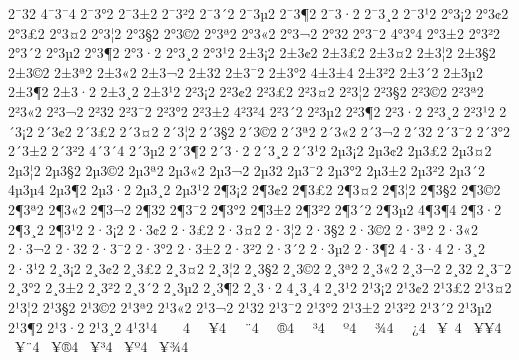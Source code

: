 {2^^af3^^ad2
4^^af3^^af4
2^^af3^^b02
2^^af3^^b12
2^^af3^^b22
2^^af3^^b42
2^^af3^^b52
2^^af3^^b62
2^^af3^^b72
2^^af3^^b82
2^^af3^^b92
2^^b03^^a12
2^^b03^^a22
2^^b03^^a32
2^^b03^^a42
2^^b03^^a62
2^^b03^^a72
2^^b03^^a92
2^^b03^^aa2
2^^b03^^ab2
2^^b03^^ac2
2^^b03^^ad2
2^^b03^^af2
4^^b03^^b04
2^^b03^^b12
2^^b03^^b22
2^^b03^^b42
2^^b03^^b52
2^^b03^^b62
2^^b03^^b72
2^^b03^^b82
2^^b03^^b92
2^^b13^^a12
2^^b13^^a22
2^^b13^^a32
2^^b13^^a42
2^^b13^^a62
2^^b13^^a72
2^^b13^^a92
2^^b13^^aa2
2^^b13^^ab2
2^^b13^^ac2
2^^b13^^ad2
2^^b13^^af2
2^^b13^^b02
4^^b13^^b14
2^^b13^^b22
2^^b13^^b42
2^^b13^^b52
2^^b13^^b62
2^^b13^^b72
2^^b13^^b82
2^^b13^^b92
2^^b23^^a12
2^^b23^^a22
2^^b23^^a32
2^^b23^^a42
2^^b23^^a62
2^^b23^^a72
2^^b23^^a92
2^^b23^^aa2
2^^b23^^ab2
2^^b23^^ac2
2^^b23^^ad2
2^^b23^^af2
2^^b23^^b02
2^^b23^^b12
4^^b23^^b24
2^^b23^^b42
2^^b23^^b52
2^^b23^^b62
2^^b23^^b72
2^^b23^^b82
2^^b23^^b92
2^^b43^^a12
2^^b43^^a22
2^^b43^^a32
2^^b43^^a42
2^^b43^^a62
2^^b43^^a72
2^^b43^^a92
2^^b43^^aa2
2^^b43^^ab2
2^^b43^^ac2
2^^b43^^ad2
2^^b43^^af2
2^^b43^^b02
2^^b43^^b12
2^^b43^^b22
4^^b43^^b44
2^^b43^^b52
2^^b43^^b62
2^^b43^^b72
2^^b43^^b82
2^^b43^^b92
2^^b53^^a12
2^^b53^^a22
2^^b53^^a32
2^^b53^^a42
2^^b53^^a62
2^^b53^^a72
2^^b53^^a92
2^^b53^^aa2
2^^b53^^ab2
2^^b53^^ac2
2^^b53^^ad2
2^^b53^^af2
2^^b53^^b02
2^^b53^^b12
2^^b53^^b22
2^^b53^^b42
4^^b53^^b54
2^^b53^^b62
2^^b53^^b72
2^^b53^^b82
2^^b53^^b92
2^^b63^^a12
2^^b63^^a22
2^^b63^^a32
2^^b63^^a42
2^^b63^^a62
2^^b63^^a72
2^^b63^^a92
2^^b63^^aa2
2^^b63^^ab2
2^^b63^^ac2
2^^b63^^ad2
2^^b63^^af2
2^^b63^^b02
2^^b63^^b12
2^^b63^^b22
2^^b63^^b42
2^^b63^^b52
4^^b63^^b64
2^^b63^^b72
2^^b63^^b82
2^^b63^^b92
2^^b73^^a12
2^^b73^^a22
2^^b73^^a32
2^^b73^^a42
2^^b73^^a62
2^^b73^^a72
2^^b73^^a92
2^^b73^^aa2
2^^b73^^ab2
2^^b73^^ac2
2^^b73^^ad2
2^^b73^^af2
2^^b73^^b02
2^^b73^^b12
2^^b73^^b22
2^^b73^^b42
2^^b73^^b52
2^^b73^^b62
4^^b73^^b74
2^^b73^^b82
2^^b73^^b92
2^^b83^^a12
2^^b83^^a22
2^^b83^^a32
2^^b83^^a42
2^^b83^^a62
2^^b83^^a72
2^^b83^^a92
2^^b83^^aa2
2^^b83^^ab2
2^^b83^^ac2
2^^b83^^ad2
2^^b83^^af2
2^^b83^^b02
2^^b83^^b12
2^^b83^^b22
2^^b83^^b42
2^^b83^^b52
2^^b83^^b62
2^^b83^^b72
4^^b83^^b84
2^^b83^^b92
2^^b93^^a12
2^^b93^^a22
2^^b93^^a32
2^^b93^^a42
2^^b93^^a62
2^^b93^^a72
2^^b93^^a92
2^^b93^^aa2
2^^b93^^ab2
2^^b93^^ac2
2^^b93^^ad2
2^^b93^^af2
2^^b93^^b02
2^^b93^^b12
2^^b93^^b22
2^^b93^^b42
2^^b93^^b52
2^^b93^^b62
2^^b93^^b72
2^^b93^^b82
4^^b93^^b94
^^a0^^a0^^a04
^^a0^^a0^^a54
^^a0^^a0^^a84
^^a0^^a0^^ae4
^^a0^^a0^^b34
^^a0^^a0^^ba4
^^a0^^a0^^be4
^^a0^^a0^^bf4
^^a0^^a5^^a04
^^a0^^a5^^a54
^^a0^^a5^^a84
^^a0^^a5^^ae4
^^a0^^a5^^b34
^^a0^^a5^^ba4
^^a0^^a5^^be4
}
